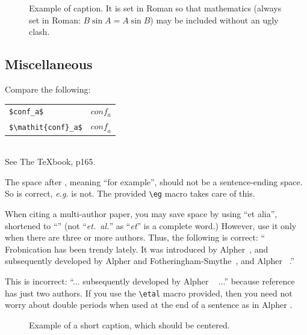 \documentclass[10pt,twocolumn,letterpaper]{article}
\begin{document}
\begin{figure}[t]
\begin{center}
\fbox{\rule{0pt}{2in} \rule{0.9\linewidth}{0pt}}
\end{center}
   \caption{Example of caption.  It is set in Roman so that mathematics
   (always set in Roman: $B \sin A = A \sin B$) may be included without an
   ugly clash.}
\label{fig:long}
\label{fig:onecol}
\end{figure}

\subsection{Miscellaneous}

\noindent
Compare the following:\\
\begin{tabular}{ll}
 \verb'$conf_a$' &  $conf_a$ \\
 \verb'$\mathit{conf}_a$' & $\mathit{conf}_a$
\end{tabular}\\
See The \TeX book, p165.

The space after \eg, meaning ``for example'', should not be a
sentence-ending space. So \eg is correct, {\em e.g.} is not.  The provided
\verb'\eg' macro takes care of this.

When citing a multi-author paper, you may save space by using ``et alia'',
shortened to ``\etal'' (not ``{\em et.\ al.}'' as ``{\em et}'' is a complete word.)
However, use it only when there are three or more authors.  Thus, the
following is correct: ``
   Frobnication has been trendy lately.
   It was introduced by Alpher~\cite{Alpher02}, and subsequently developed by
   Alpher and Fotheringham-Smythe~\cite{Alpher03}, and Alpher \etal~\cite{Alpher04}.''

This is incorrect: ``... subsequently developed by Alpher \etal~\cite{Alpher03} ...''
because reference~\cite{Alpher03} has just two authors.  If you use the
\verb'\etal' macro provided, then you need not worry about double periods
when used at the end of a sentence as in Alpher \etal.



\begin{figure}
\begin{center}
\fbox{\rule{0pt}{2in} \rule{.9\linewidth}{0pt}}
\end{center}
   \caption{Example of a short caption, which should be centered.}
\label{fig:short}
\end{figure}
\end{document}
